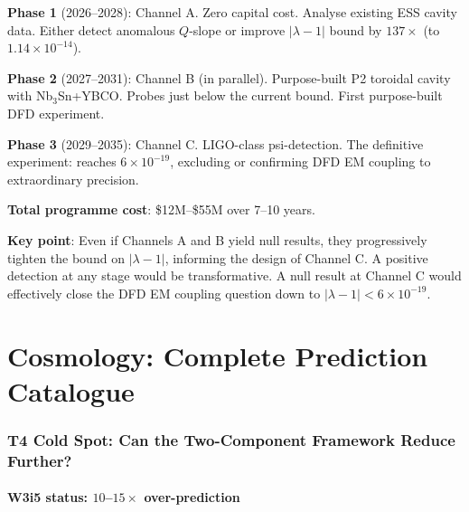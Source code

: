 \documentclass[11pt]{article}
\newcommand{\ee}[1]{\times 10^{#1}}
\newcommand{\lamdiff}{|\lambda{-}1|}
\begin{document}
\begin{tcolorbox}[colback=blue!5!white, colframe=blue!60!black,
  title=\textbf{P15 Minimal Programme: Strategy}]
\textbf{Phase 1} (2026--2028): Channel A. Zero capital cost. Analyse
existing ESS cavity data. Either detect anomalous $Q$-slope or improve
$\lamdiff$ bound by $137\times$ (to $1.14\ee{-14}$).

\textbf{Phase 2} (2027--2031): Channel B (in parallel). Purpose-built
P2 toroidal cavity with Nb$_3$Sn+YBCO. Probes just below the current
bound. First purpose-built DFD experiment.

\textbf{Phase 3} (2029--2035): Channel C. LIGO-class psi-detection.
The definitive experiment: reaches $6\ee{-19}$, excluding or confirming
DFD EM coupling to extraordinary precision.

\textbf{Total programme cost}: \$12M--\$55M over 7--10 years.

\textbf{Key point}: Even if Channels A and B yield null results, they
progressively tighten the bound on $\lamdiff$, informing the design of
Channel C. A positive detection at any stage would be transformative.
A null result at Channel C would effectively close the DFD EM coupling
question down to $\lamdiff < 6\ee{-19}$.
\end{tcolorbox}

\newpage

\part{Cosmology: Complete Prediction Catalogue}
\label{part:Cosmo}

\section{T4 Cold Spot: Can the Two-Component Framework Reduce Further?}
\label{sec:T4-analysis}

\subsection{W3i5 status: $10$--$15\times$ over-prediction}
\end{document}
